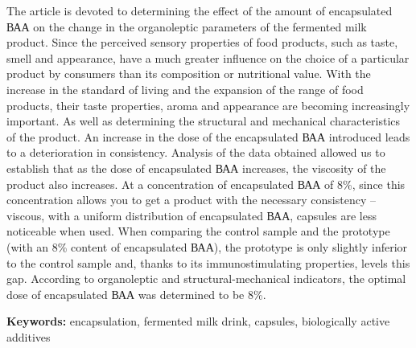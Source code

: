 The article is devoted to determining the effect of the amount of
encapsulated ВАА on the change in the organoleptic parameters of the
fermented milk product. Since the perceived sensory properties of food
products, such as taste, smell and appearance, have a much greater
influence on the choice of a particular product by consumers than its
composition or nutritional value. With the increase in the standard of
living and the expansion of the range of food products, their taste
properties, aroma and appearance are becoming increasingly important. As
well as determining the structural and mechanical characteristics of the
product. An increase in the dose of the encapsulated ВАА introduced
leads to a deterioration in consistency. Analysis of the data obtained
allowed us to establish that as the dose of encapsulated ВАА increases,
the viscosity of the product also increases. At a concentration of
encapsulated ВАА of 8\%, since this concentration allows you to get a
product with the necessary consistency -- viscous, with a uniform
distribution of encapsulated ВАА, capsules are less noticeable when
used. When comparing the control sample and the prototype (with an 8\%
content of encapsulated ВАА), the prototype is only slightly inferior to
the control sample and, thanks to its immunostimulating properties,
levels this gap. According to organoleptic and structural-mechanical
indicators, the optimal dose of encapsulated ВАА was determined to be
8\%.

{\bfseries Keywords:} encapsulation, fermented milk drink, capsules,
biologically active additives

